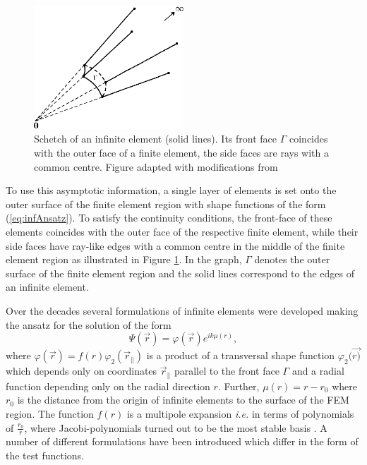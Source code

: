 \begin{figure}
\includegraphics[width=0.5\textwidth]{Figures/BC/InfElem}
\caption{Schetch of an infinite element (solid lines).
Its front face $\Gamma$ coincides with the outer face of a finite element, the side faces are rays with a common centre. 
Figure adapted with modifications from \cite{dreyer}}
\label{fig:IElem}
\end{figure}
To use this asymptotic information, a single layer of elements is set onto the outer surface of the finite element region with shape functions of the form (\ref{eq:infAnsatz}).
To satisfy the continuity conditions, the front-face of these elements coincides with the outer face of the respective finite element, while their side faces have ray-like edges with a common centre in the middle of the finite element region as illustrated in Figure \ref{fig:IElem}.
In the graph, $\Gamma$ denotes the outer surface of the finite element region and the solid lines correspond to the edges of an infinite element.

Over the decades several formulations of infinite elements were developed making the ansatz for the solution of the form
\begin{equation} \label{eq:Infansatz}
 \Psi(\vec{r}) = \varphi(\vec{r}) e^{ik\mu(r)},
\end{equation}
where $\varphi(\vec{r})=f(r)\varphi_2(\vec{r}_\parallel)$ is a product of a transversal shape function $\varphi_2(\vec{r)}$ which depends only on coordinates $\vec{r}_\parallel$ parallel to the front face $\Gamma$ and a radial function depending only on the radial direction $r$.
Further, $\mu(r)=r-r_0$ where $r_0$ is the distance from the origin of infinite elements to the surface of the FEM region.
The function $f(r)$ is a multipole expansion \textit{i.e.} in terms of polynomials of $\frac{r_0}{r}$, where Jacobi-polynomials turned out to be the most stable basis \cite{dreyer_improved, infelNew}.
A number of different formulations have been introduced which differ in the form of the test functions.

